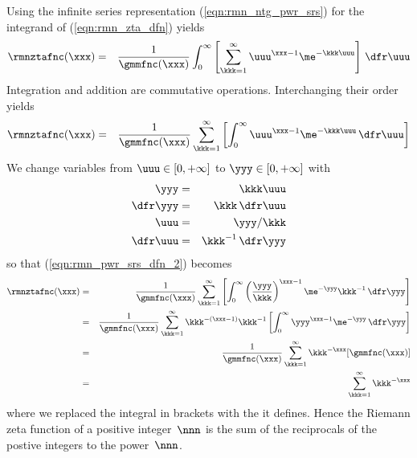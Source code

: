 \documentclass[12pt]{article}
\begin{document}
Using the infinite series representation (\ref{eqn:rmn_ntg_pwr_srs}) for
the integrand of (\ref{eqn:rmn_zta_dfn}) yields
\begin{eqnarray}
\rmnztafnc(\xxx) & = & \frac{1}{\gmmfnc(\xxx)}
\int_{0}^{\infty} \left[ \sum_{\kkk=1}^{\infty} \uuu^{\xxx-1}
  \me^{-\kkk\uuu} \right] \,\dfr\uuu \nonumber
\label{eqn:rmn_pwr_srs_dfn_1}
\end{eqnarray}
Integration and addition are commutative operations.
Interchanging their order yields
\begin{eqnarray}
\rmnztafnc(\xxx) & = & \frac{1}{\gmmfnc(\xxx)}
\sum_{\kkk=1}^{\infty} 
\left[ \int_{0}^{\infty} \uuu^{\xxx-1} \me^{-\kkk\uuu}  \,\dfr\uuu \right]
\label{eqn:rmn_pwr_srs_dfn_2}
\end{eqnarray}
We change variables from 
$\uuu \in [0,+\infty]$ to $\yyy \in [0,+\infty]$ with
\begin{eqnarray}
\yyy & = & \kkk\uuu \nonumber \\
\dfr\yyy & = & \kkk \,\dfr\uuu \nonumber \\
\uuu & = & \yyy/\kkk \nonumber \\
\dfr\uuu & = & \kkk^{-1} \,\dfr\yyy
\label{eqn:rmn_cov}
\end{eqnarray}
so that (\ref{eqn:rmn_pwr_srs_dfn_2}) becomes
\begin{eqnarray}
\rmnztafnc(\xxx) & = & \frac{1}{\gmmfnc(\xxx)}
\sum_{\kkk=1}^{\infty} 
\left[ \int_{0}^{\infty} \left( \frac{\yyy}{\kkk} \right)^{\xxx-1} 
\me^{-\yyy} \kkk^{-1} \,\dfr\yyy \right] \nonumber \\
& = & \frac{1}{\gmmfnc(\xxx)}
\sum_{\kkk=1}^{\infty} \kkk^{-(\xxx-1)} \kkk^{-1}
\left[ \int_{0}^{\infty} \yyy^{\xxx-1} \me^{-\yyy} \,\dfr\yyy \right] \nonumber \\
& = & \frac{1}{\gmmfnc(\xxx)}
\sum_{\kkk=1}^{\infty} \kkk^{-\xxx} [ \gmmfnc(\xxx) ] \nonumber \\
& = & \sum_{\kkk=1}^{\infty} \kkk^{-\xxx}
\label{eqn:rmn_pwr_srs_dfn_3}
\end{eqnarray}
where we replaced the integral in brackets with the 
 it defines.
Hence the Riemann zeta function of a positive integer~$\nnn$ is the
sum of the reciprocals of the postive integers to the power~$\nnn$.
\end{document}
